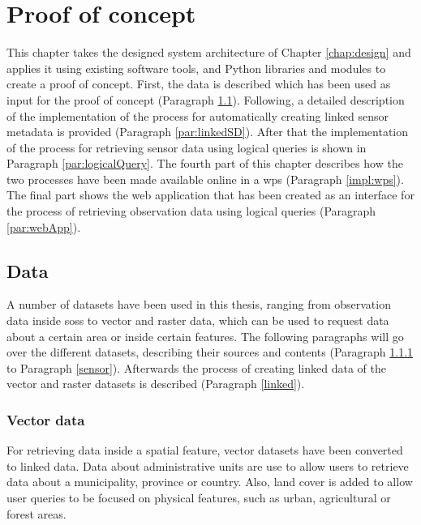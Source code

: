 \chapter{Proof of concept}
\label{chap:impl}
This chapter takes the designed system architecture of Chapter \ref{chap:design} and applies it using existing software tools, and Python libraries and modules to create a proof of concept. First, the data is described which has been used as input for the proof of concept (Paragraph \ref{chap:data}). Following, a detailed description of the implementation of the process for automatically creating linked sensor metadata is provided (Paragraph \ref{par:linkedSD}). After that the implementation of the process for retrieving sensor data using logical queries is shown in Paragraph \ref{par:logicalQuery}. The fourth part of this chapter describes how the two processes have been made available online in a \acf{wps} (Paragraph \ref{impl:wps}). The final part shows the web application that has been created as an interface for the process of retrieving observation data using logical queries (Paragraph \ref{par:webApp}).

\section{Data}
\label{chap:data}

A number of datasets have been used in this thesis, ranging from observation data inside \aclp{sos} to vector and raster data, which can be used to request data about a certain area or inside certain features. The following paragraphs will go over the different datasets, describing their sources and contents (Paragraph \ref{vector} to Paragraph \ref{sensor}). Afterwards the process of creating linked data of the vector and raster datasets is described (Paragraph \ref{linked}).  

\subsection{Vector data}
\label{vector}
For retrieving data inside a spatial feature, vector datasets have been converted to linked data. Data about administrative units are use to allow users to retrieve data about a municipality, province or country. Also, land cover is added to allow user queries to be focused on physical features, such as urban, agricultural or forest areas.   

